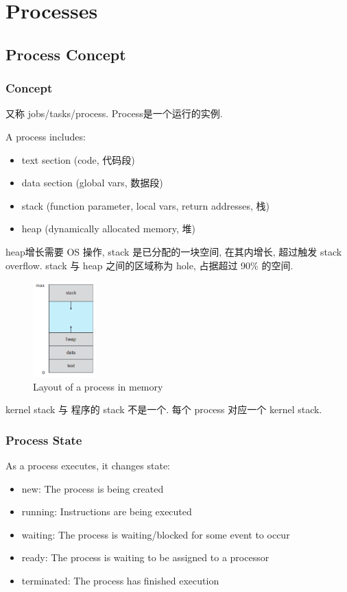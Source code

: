 \newpage
\section{Processes}
\subsection{Process Concept}
\subsubsection{Concept}
又称 jobs/tasks/process. Process是一个运行的实例. 

A process includes:
\begin{itemize}
    \item text section (code, 代码段)
    \item data section (global vars, 数据段)
    \item stack (function parameter, local vars, return addresses, 栈)
    \item heap (dynamically allocated memory, 堆)
\end{itemize}

heap增长需要 OS 操作, stack 是已分配的一块空间, 在其内增长, 超过触发 stack overflow. stack 与 heap 之间的区域称为 hole, 占据超过 90\% 的空间. 

\begin{figure}[!htb]
    \centering
    \includegraphics[width=0.22\textwidth]{pic/OS3/Layout of a process in memory.png}
    \caption{Layout of a process in memory}
\end{figure}

kernel stack 与 程序的 stack 不是一个. 每个 process 对应一个 kernel stack. 

\subsubsection{Process State}
As a process executes, it changes state:
\begin{itemize}\small
    \item new: The process is being created
    \item running: Instructions are being executed
    \item waiting: The process is waiting/blocked for some event to occur
    \item ready: The process is waiting to be assigned to a processor
    \item terminated: The process has finished execution
\end{itemize}

